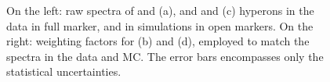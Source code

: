 \begin{figure}[!t]
\hspace*{-1.5cm}
\hspace*{-1.5cm}
\caption{On the left: raw \pT spectra of \rmXiM and \rmAxiP (a), and \rmOmegaM and \rmAomegaP (c) hyperons in the data in full marker, and in simulations in open markers. On the right: weighting factors for \rmXiPM (b) and \rmOmegaPM (d), employed to match the \pT spectra in the data and MC. The error bars encompasses only the statistical uncertainties.}
	\label{fig:PtSpectra}
\end{figure}


